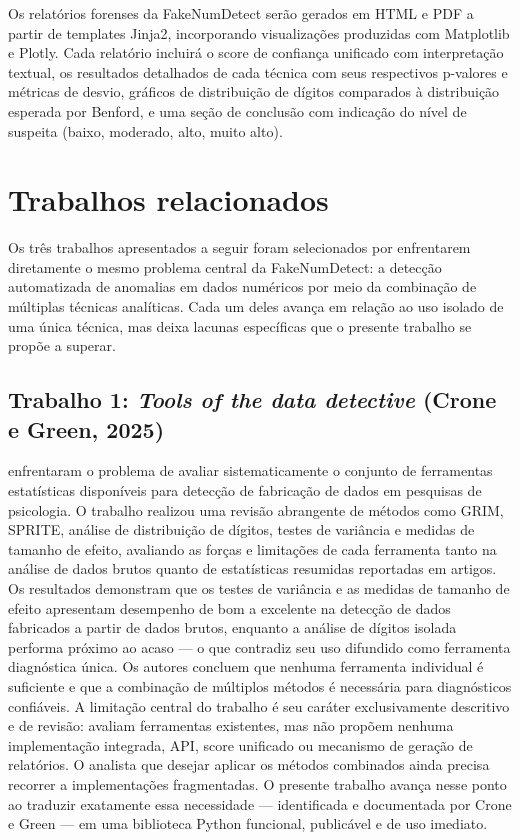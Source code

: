 \documentclass[
    12pt,                %
    openright,           %
    oneside,             %
    a4paper,             %
    english,             %
    brazil               %
]{abntex2}
\begin{document}
Os relatórios forenses da FakeNumDetect serão gerados em HTML e PDF a partir de templates Jinja2, 
incorporando visualizações produzidas com Matplotlib e Plotly. Cada relatório incluirá o score de 
confiança unificado com interpretação textual, os resultados detalhados de cada técnica com seus 
respectivos p-valores e métricas de desvio, gráficos de distribuição de dígitos comparados à distribuição 
esperada por Benford, e uma seção de conclusão com indicação do nível de suspeita (baixo, moderado, alto, muito alto).

\section{Trabalhos relacionados}
\label{sec:trabalhos_relacionados}

Os três trabalhos apresentados a seguir foram selecionados por enfrentarem diretamente o mesmo problema 
central da FakeNumDetect: a detecção automatizada de anomalias em dados numéricos por meio da combinação de 
múltiplas técnicas analíticas. Cada um deles avança em relação ao uso isolado de uma única técnica, mas deixa 
lacunas específicas que o presente trabalho se propõe a superar.

\subsection{Trabalho 1: \textit{Tools of the data detective} (Crone e Green, 2025)}

 enfrentaram o problema de avaliar sistematicamente o conjunto de ferramentas estatísticas disponíveis para detecção de fabricação de dados em pesquisas de psicologia. O trabalho realizou uma revisão abrangente de métodos como GRIM, SPRITE, análise de distribuição de dígitos, testes de variância e medidas de tamanho de efeito, avaliando as forças e limitações de cada ferramenta tanto na análise de dados brutos quanto de estatísticas resumidas reportadas em artigos.
Os resultados demonstram que os testes de variância e as medidas de tamanho de efeito apresentam desempenho de bom a excelente na detecção de dados fabricados a partir de dados brutos, enquanto a análise de dígitos isolada performa próximo ao acaso — o que contradiz seu uso difundido como ferramenta diagnóstica única. Os autores concluem que nenhuma ferramenta individual é suficiente e que a combinação de múltiplos métodos é necessária para diagnósticos confiáveis.
A limitação central do trabalho é seu caráter exclusivamente descritivo e de revisão:  avaliam ferramentas existentes, mas não propõem nenhuma implementação integrada, API, score unificado ou mecanismo de geração de relatórios. O analista que desejar aplicar os métodos combinados ainda precisa recorrer a implementações fragmentadas. O presente trabalho avança nesse ponto ao traduzir exatamente essa necessidade — identificada e documentada por Crone e Green — em uma biblioteca Python funcional, publicável e de uso imediato.
\end{document}
